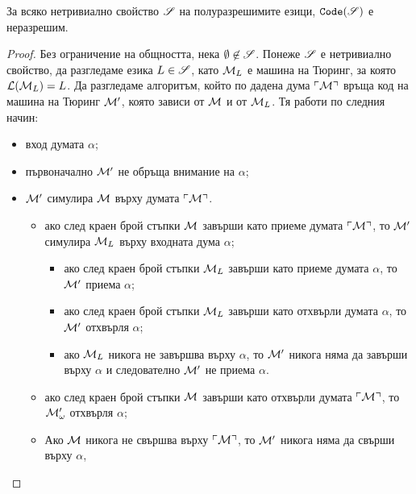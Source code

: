 \begin{important}
  \begin{theorem}
    За всяко нетривиално свойство $\mathscr{S}$ на полуразрешимите езици,
    $\texttt{Code}(\mathscr{S})$ е неразрешим.
  \end{theorem}
\end{important}
\begin{proof}
  Без ограничение на общността, нека $\emptyset \not\in \mathscr{S}$.
  Понеже $\mathscr{S}$ е нетривиално свойство, да разгледаме езика $L \in \mathscr{S}$,
  като $\mathcal{M}_L$ е машина на Тюринг, за която $\mathcal{L}(\mathcal{M}_L) = L$.
  Да разгледаме алгоритъм, който по дадена дума $\ulcorner{\mathcal{M}}\urcorner$
  връща код на машина на Тюринг $\mathcal{M}'$, която зависи от $\mathcal{M}$ и от $\mathcal{M}_L$.
  Тя работи по следния начин:
  \begin{itemize}
  \item
    вход думата $\alpha$;
  \item
    първоначално $\mathcal{M}'$ не обръща внимание на $\alpha$;
  \item
    $\mathcal{M}'$ симулира $\mathcal{M}$ върху думата $\ulcorner{\mathcal{M}}\urcorner$.
    \begin{itemize}
    \item
      ако след краен брой стъпки $\mathcal{M}$ завърши като приеме думата $\ulcorner{\mathcal{M}}\urcorner$, то 
      $\mathcal{M}'$ симулира $\mathcal{M}_L$ върху входната дума $\alpha$;
      \begin{itemize}
      \item
        ако след краен брой стъпки $\mathcal{M}_L$ завърши като приеме думата $\alpha$, то 
        $\mathcal{M}'$ приема $\alpha$;
      \item 
        ако след краен брой стъпки $\mathcal{M}_L$ завърши като отхвърли думата $\alpha$, то 
        $\mathcal{M}'$ отхвърля $\alpha$;
      \item
        ако $\mathcal{M}_L$ никога не завършва върху $\alpha$, то 
        $\mathcal{M}'$ никога няма да завърши върху $\alpha$ и следователно $\mathcal{M}'$
        не приема $\alpha$.
      \end{itemize}
    \item
      ако след краен брой стъпки $\mathcal{M}$ завърши като отхвърли думата $\ulcorner{\mathcal{M}}\urcorner$, то 
      $\mathcal{M}'_\omega$ отхвърля $\alpha$;
    \item
      Ако $\mathcal{M}$ никога не свършва върху $\ulcorner{\mathcal{M}}\urcorner$, то $\mathcal{M}'$ никога няма да свърши върху $\alpha$,

\end{itemize}
\end{itemize}
\end{proof}
